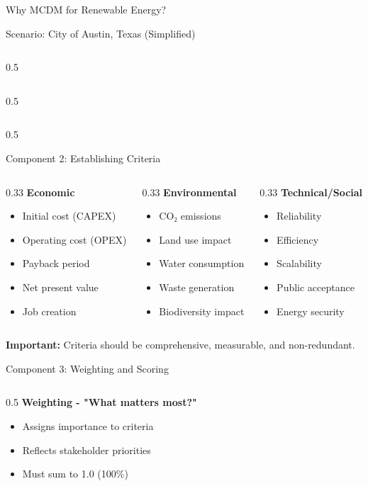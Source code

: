 \documentclass[aspectratio=169]{beamer}
\begin{document}
\begin{frame}{Why MCDM for Renewable Energy?}
\begin{center}
\begin{block}{Scenario: City of Austin, Texas (Simplified)}
\begin{column}{0.5\textwidth}
\begin{itemize}
\begin{column}{0.5\textwidth}
\begin{itemize}
\begin{columns}
\begin{column}{0.5\textwidth}
\begin{center}
\begin{frame}{Component 2: Establishing Criteria}
\begin{columns}
\begin{column}{0.33\textwidth}
\textcolor{energygreen}{\textbf{Economic}}
\begin{itemize}
\item Initial cost (CAPEX)
\item Operating cost (OPEX)
\item Payback period
\item Net present value
\item Job creation
\end{itemize}
\end{column}
\begin{column}{0.33\textwidth}
\textcolor{solarorange}{\textbf{Environmental}}
\begin{itemize}
\item CO₂ emissions
\item Land use impact
\item Water consumption
\item Waste generation
\item Biodiversity impact
\end{itemize}
\end{column}
\begin{column}{0.33\textwidth}
\textcolor{windblue}{\textbf{Technical/Social}}
\begin{itemize}
\item Reliability
\item Efficiency
\item Scalability
\item Public acceptance
\item Energy security
\end{itemize}
\end{column}
\end{columns}

\vspace{0.3cm}
\textbf{Important:} Criteria should be comprehensive, measurable, and non-redundant.
\end{frame}

\begin{frame}{Component 3: Weighting and Scoring}
\begin{columns}
\begin{column}{0.5\textwidth}
\textbf{\textcolor{windblue}{Weighting - "What matters most?"}}
\begin{itemize}
\item Assigns importance to criteria
\item Reflects stakeholder priorities
\item Must sum to 1.0 (100\%)
\end{itemize}


\end{column}
\end{columns}
\end{frame}
\end{center}
\end{column}
\end{columns}
\end{itemize}
\end{column}
\end{itemize}
\end{column}
\end{block}
\end{center}
\end{frame}
\end{document}
